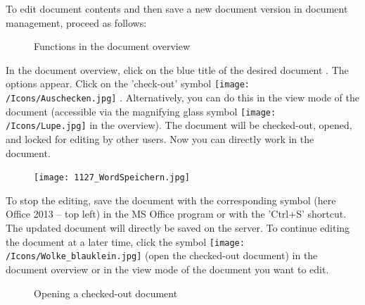 To edit document contents and then save a new document version in document management, proceed as follows:

\begin{figure}[H]
\caption{Functions in the document overview}
\end{figure}

In the document overview, click on the blue title of the desired document . The options appear. Click on the 'check-out' symbol \texttt{[image: /Icons/Auschecken.jpg]} . Alternatively, you can do this in the view mode of the document (accessible via the magnifying glass symbol \texttt{[image: /Icons/Lupe.jpg]}  in the overview). The document will be checked-out, opened, and locked for editing by other users. Now you can directly work in the document.

\begin{figure}
\vspace{-15pt}
\texttt{[image: 1127\_WordSpeichern.jpg]}
\end{figure}
To stop the editing, save the document with the corresponding symbol  (here Office 2013 -- top left) in the MS Office program or with the 'Ctrl+S' shortcut. The updated document will directly be saved on the server. To continue editing the document at a later time, click the symbol \texttt{[image: /Icons/Wolke\_blauklein.jpg]}  (open the checked-out document) in the document overview or in the view mode of the document you want to edit.

\begin{figure}[H]
\caption{Opening a checked-out document}
\end{figure}

